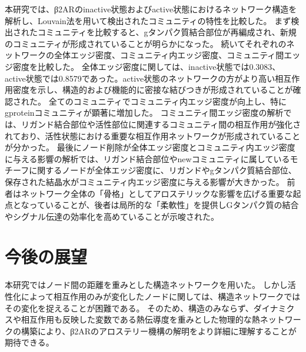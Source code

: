 本研究では、β2ARのinactive状態およびactive状態におけるネットワーク構造を解析し、Louvain法を用いて検出されたコミュニティの特性を比較した。
まず検出されたコミュニティを比較すると、gタンパク質結合部位が再編成され、新規のコミュニティが形成されていることが明らかになった。
続いてそれぞれのネットワークの全体エッジ密度、コミュニティ内エッジ密度、コミュニティ間エッジ密度を比較した。
全体エッジ密度に関しては、inactive状態では0.3083、active状態では0.8579であった。active状態のネットワークの方がより高い相互作用密度を示し、構造的および機能的に密接な結びつきが形成されていることが確認された。
全てのコミュニティでコミュニティ内エッジ密度が向上し、特にgproteinコミュニティが顕著に増加した。
コミュニティ間エッジ密度の解析では、リガンド結合部位や活性部位に関連するコミュニティ間の相互作用が強化されており、活性状態における重要な相互作用ネットワークが形成されていることが分かった。
最後にノード削除が全体エッジ密度とコミュニティ内エッジ密度に与える影響の解析では、リガンド結合部位やnewコミュニティに属しているモチーフに関するノードが全体エッジ密度に、リガンドやgタンパク質結合部位、保存された結晶水がコミュニティ内エッジ密度に与える影響が大きかった。
前者はネットワーク全体の「骨格」としてアロステリックな影響を広げる重要な起点となっていることが、後者は局所的な「柔軟性」を提供しGタンパク質の結合やシグナル伝達の効率化を高めていることが示唆された。

\section{今後の展望}
本研究ではノード間の距離を重みとした構造ネットワークを用いた。
しかし活性化によって相互作用のみが変化したノードに関しては、構造ネットワークではその変化を捉えることが困難である。
そのため、構造のみならず、ダイナミクスや相互作用も反映した変数である熱伝導度を重みとした物理的な熱ネットワークの構築により、β2ARのアロステリー機構の解明をより詳細に理解することが期待できる。